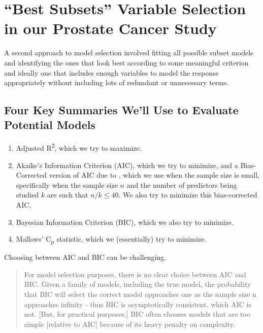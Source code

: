 \documentclass[]{book}
\providecommand{\tightlist}{%
  \setlength{\itemsep}{0pt}\setlength{\parskip}{0pt}}
\theoremstyle{definition}
\theoremstyle{definition}
\theoremstyle{definition}
\theoremstyle{remark}
\begin{document}
\chapter{\texorpdfstring{``Best Subsets'' Variable Selection in our
Prostate Cancer
Study}{Best Subsets Variable Selection in our Prostate Cancer Study}}\label{best-subsets-variable-selection-in-our-prostate-cancer-study}

A second approach to model selection involved fitting all possible
subset models and identifying the ones that look best according to some
meaningful criterion and ideally one that includes enough variables to
model the response appropriately without including lots of redundant or
unnecessary terms.

\section{Four Key Summaries We'll Use to Evaluate Potential
Models}\label{four-key-summaries-well-use-to-evaluate-potential-models}

\begin{enumerate}
\def\labelenumi{\arabic{enumi}.}
\tightlist
\item
  Adjusted R\textsuperscript{2}, which we try to maximize.
\item
  Akaike's Information Criterion (AIC), which we try to minimize, and a
  Bias-Corrected version of AIC due to \citet{HurvichTsai1989}, which we
  use when the sample size is small, specifically when the sample size
  \(n\) and the number of predictors being studied \(k\) are such that
  \(n/k \leq 40\). We also try to minimize this bias-corrected AIC.
\item
  Bayesian Information Criterion (BIC), which we also try to minimize.
\item
  Mallows' C\textsubscript{p} statistic, which we (essentially) try to
  minimize.
\end{enumerate}

Choosing between AIC and BIC can be challenging.

\begin{quote}
For model selection purposes, there is no clear choice between AIC and
BIC. Given a family of models, including the true model, the probability
that BIC will select the correct model approaches one as the sample size
n approaches infinity - thus BIC is asymptotically consistent, which AIC
is not. {[}But, for practical purposes,{]} BIC often chooses models that
are too simple {[}relative to AIC{]} because of its heavy penalty on
complexity.
\end{quote}
\end{document}
